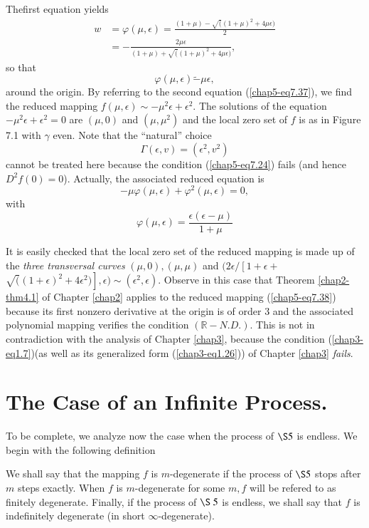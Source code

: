 The\pageoriginale first equation yields
\begin{align*}
w &= \varphi(\mu, \epsilon) = \frac{(1 + \mu) - \surd((1 + \mu)^{2} +
  4\mu \epsilon)}{2}\\ 
&= - \frac{2 \mu \epsilon}{(1 + \mu) + \surd((1 + \mu)^{2} + 4\mu \epsilon)},
\end{align*}
so that
$$
\varphi(\mu, \epsilon) \widetilde - \mu \epsilon,
$$
around the origin. By referring to the second equation
(\ref{chap5-eq7.37}), we find the reduced mapping $f(\mu, \epsilon)
\sim  -  \mu^{2} \epsilon + \epsilon^{2}$. The solutions of the
equation $- \mu^{2} \epsilon + \epsilon^{2} = 0$ are $(\mu, 0)$ and
$(\mu, \mu^{2})$ and the local zero set of $f$ is as in Figure 7.1 with
$\gamma$ even. Note that the ``natural'' choice
$$
\Gamma(\epsilon, v) = (\epsilon^{2}, v^{2})
$$
cannot be treated here because the condition (\ref{chap5-eq7.24})
fails (and hence $D^{2}f(0) = 0$). Actually, the associated reduced
equation is
\begin{equation*}
-\mu \varphi (\mu, \epsilon) + \varphi^{2} (\mu, \epsilon) =
0,\tag{7.38}\label{chap5-eq7.38} 
\end{equation*}
with
$$
\varphi(\mu, \epsilon) = \frac{\epsilon(\epsilon - \mu)}{1 + \mu}
$$

It is easily checked that the local zero set of the reduced mapping is
made up of the {\em three transversal curves} $(\mu, 0), (\mu, \mu)$
and $(2\epsilon / \left[1 + \epsilon + \right.$ $\left.\surd ((1 + \epsilon)^{2} +
  4\epsilon^{2})\right], \epsilon) \sim   (\epsilon^{2},
\epsilon)$. Observe in this case that Theorem \ref{chap2-thm4.1} of
Chapter \ref{chap2} applies to the reduced mapping
(\ref{chap5-eq7.38}) because its first nonzero derivative at the
origin is of order 3 and the associated polynomial mapping verifies
the condition $(\mathbb{R}-N.D.)$. This is not in contradiction with
the analysis of Chapter \ref{chap3}, because the condition
(\ref{chap3-eq1.7})\pageoriginale (as well as its generalized form
(\ref{chap3-eq1.26})) of Chapter \ref{chap3} {\em fails}.


\section{The Case of an Infinite Process.}\label{chap5-sec8}

To be complete, we analyze now the case when the process of $\S 5$ is
endless. We begin with the following definition

\begin{definition}\label{chap5-def8.1}
We shall say that the mapping $f$ is $m$-degenerate if the process of $\S
5$ stops after $m$ steps exactly. When $f$ is $m$-degenerate for some $m, f$
will be refered to as finitely degenerate. Finally, if the process of
$\S\ 5$ is endless, we shall say that $f$ is indefinitely degenerate (in
short $\infty$-degenerate).
\end{definition}

